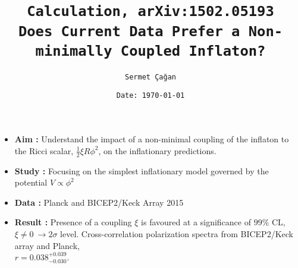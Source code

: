 


\title{\texttt{\textbf{Calculation, arXiv:1502.05193\\Does Current Data Prefer a Non-minimally Coupled Inflaton?}}}
\author{\texttt{Sermet \c{C}a\u{g}an}}
\date{\texttt{Date: \today}}



\maketitle
\vspace{2cm}
\begin{itemize}
\item \textbf{Aim :} Understand the impact of a non-minimal coupling of the inflaton to the Ricci scalar, $\frac{1}{2}\xi R\phi^{2}$, on the inflationary predictions.
\item \textbf{Study :} Focusing on the simplest inflationary model governed by the potential $V \propto \phi^{2}$
\item \textbf{Data :} Planck and BICEP2/Keck Array 2015
\item \textbf{Result :} Presence of a coupling $\xi$ is favoured at a significance of $99\%$ CL, $\xi \ne 0 \ \rightarrow 2\sigma$ level. Cross-correlation polarization spectra from BICEP2/Keck array and Planck,\\ $r = 0.038 ^{+0.039} _{-0.030}$.
\end{itemize}
\newpage



